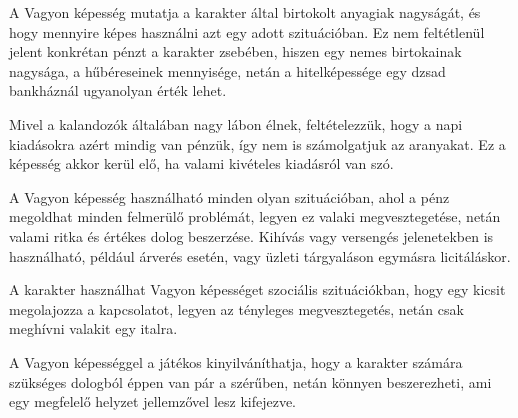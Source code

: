 
A Vagyon képesség mutatja a karakter által birtokolt anyagiak nagyságát, és hogy mennyire képes használni azt egy adott szituációban. Ez nem feltétlenül jelent konkrétan pénzt a karakter zsebében, hiszen egy nemes birtokainak nagysága, a hűbéreseinek mennyisége, netán a hitelképessége egy dzsad bankháznál ugyanolyan érték lehet.

Mivel a kalandozók általában nagy lábon élnek, feltételezzük, hogy a napi kiadásokra azért mindig van pénzük, így nem is számolgatjuk az aranyakat. Ez a képesség akkor kerül elő, ha valami kivételes kiadásról van szó.

\overcome A Vagyon képesség használható minden olyan szituációban, ahol a pénz megoldhat minden felmerülő problémát, legyen ez valaki megvesztegetése, netán valami ritka és értékes dolog beszerzése. Kihívás vagy versengés jelenetekben is használható, például árverés esetén, vagy üzleti tárgyaláson egymásra licitáláskor.

\advantage A karakter használhat Vagyon képességet szociális szituációkban, hogy egy kicsit megolajozza a kapcsolatot, legyen az tényleges megvesztegetés, netán csak meghívni valakit egy italra.

A Vagyon képességgel a játékos kinyilváníthatja, hogy a karakter számára szükséges dologból éppen van pár a szérűben, netán könnyen beszerezheti, ami egy megfelelő helyzet jellemzővel lesz kifejezve.

\noattackatall
 
\nodefendatall




